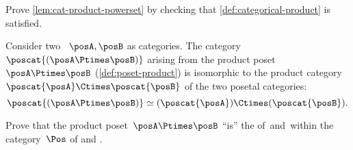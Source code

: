 \vfill
\begin{gradedexercise}
    \label{ex:CatProductPowerset}
    Prove \cref{lem:cat-product-powerset} by checking that \cref{def:categorical-product} is satisfied.
\end{gradedexercise}


\begin{example}
    Consider two ~$\posA,\posB$ as categories.
    The category~$\poscat{(\posA\Ptimes \posB)}$ arising from the product poset~$\posA\Ptimes \posB$ (\cref{def:poset-product}) is isomorphic to the product category~$\poscat{\posA} \Ctimes \poscat{\posB}$ of the two posetal categories:
    \begin{equation}
        \poscat{(\posA\Ptimes \posB)} \simeq (\poscat{\posA}) \Ctimes (\poscat{\posB}).
    \end{equation}
\end{example}

\begin{gradedexercise}
    Prove that the product poset~$\posA \Ptimes \posB$ ``is'' the  of~\posA and~\posB within the category~$\Pos$ of  and .
\end{gradedexercise}

